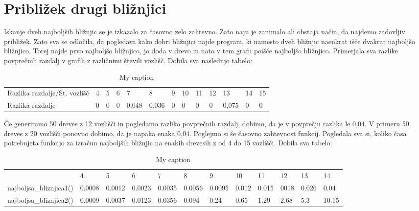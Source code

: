 \documentclass[a4paper,10pt]{article}
\begin{document}
{\section{Približek drugi bližnjici}
Iskanje dveh najboljših bližnjic se je izkazalo za časovno zelo zahtevno. Zato naju je zanimalo ali obstaja način, da najdemo zadovljiv približek. Zato sva se odločila, da pogledava kako dobri bližnjici najde program, ki namesto dveh bližnjic naenkrat išče dvakrat najboljšo bližnjico. Torej najde prvo najboljšo bližnjico, jo doda v drevo in nato v tem grafu poišče najboljšo bližnjico. Primerjala sva razlike povprečnih razdalj v grafih z različnimi števili vozlišč. Dobila sva naslednjo tabelo: \newline
\begin{table}[]
\centering
\caption{My caption}
\label{my-label}
\begin{tabular}{lllllllllllll}
Razlika razdalje/Št. vozlišč & 4 & 5 & 6 & 7     & 8     & 9 & 10 & 11 & 12 & 13    & 14 & 15 \\
Razlika razdalje             & 0 & 0 & 0 & 0,048 & 0,036 & 0 & 0  & 0  & 0  & 0,075 & 0  & 0 
\end{tabular}
\end{table}
\newline
Če generiramo 50 dreves z 12 vozlišči in pogledamo razliko povprečnih razdalj, dobimo, da je v povprečju razlika le 0,04. V primeru 50 dreves z 20 vozlišči ponovno dobimo, da je napaka enaka 0,04. \newline
Poglejmo si še časovno zahtevnost funkcij. Pogledala sva si, koliko časa potrebujeta funkcijo za izračun najboljših bližnjic na enakih drevesih z od 4 do 15 vozlišči. Dobila sva tabelo: \newline
\begin{table}[]
\centering
\caption{My caption}
\label{my-label}
\begin{tabular}{llllllllllll}
                        & 4      & 5      & 6      & 7      & 8      & 9      & 10    & 11    & 12   & 13    & 14    \\ 
najboljsa\_bliznjica1() & 0.0008 & 0.0012 & 0.0023 & 0.0035 & 0.0056 & 0.0095 & 0.012 & 0.015 & 0018 & 0.026 & 0.04  \\ 
najboljsa\_bliznjica2() & 0.0009 & 0.0037 & 0.0123 & 0.0356 & 0.094  & 0.24   & 0.65  & 1.29  & 2.68 & 5.3   & 10.15 \\ 
\end{tabular}
\end{table}
\newline

}
\end{document}
